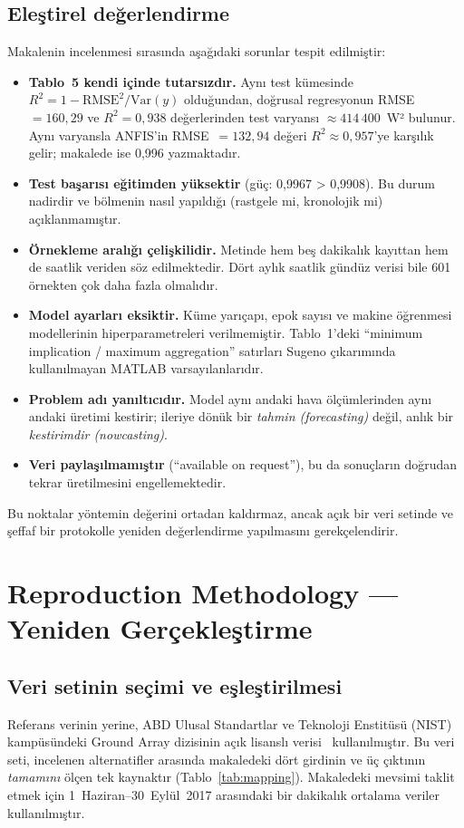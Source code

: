 \documentclass[11pt,a4paper]{article}
\begin{document}
\subsection{Eleştirel değerlendirme}
Makalenin incelenmesi sırasında aşağıdaki sorunlar tespit edilmiştir:
\begin{itemize}
\item \textbf{Tablo~5 kendi içinde tutarsızdır.} Aynı test kümesinde $R^2=1-\mathrm{RMSE}^2/\mathrm{Var}(y)$ olduğundan, doğrusal regresyonun RMSE~$=160{,}29$ ve $R^2=0{,}938$ değerlerinden test varyansı $\approx 414\,400$~W² bulunur. Aynı varyansla ANFIS'in RMSE~$=132{,}94$ değeri $R^2\approx0{,}957$'ye karşılık gelir; makalede ise 0,996 yazmaktadır.
\item \textbf{Test başarısı eğitimden yüksektir} (güç: 0,9967 > 0,9908). Bu durum nadirdir ve bölmenin nasıl yapıldığı (rastgele mi, kronolojik mi) açıklanmamıştır.
\item \textbf{Örnekleme aralığı çelişkilidir.} Metinde hem beş dakikalık kayıttan hem de saatlik veriden söz edilmektedir. Dört aylık saatlik gündüz verisi bile 601 örnekten çok daha fazla olmalıdır.
\item \textbf{Model ayarları eksiktir.} Küme yarıçapı, epok sayısı ve makine öğrenmesi modellerinin hiperparametreleri verilmemiştir. Tablo~1'deki “minimum implication / maximum aggregation” satırları Sugeno çıkarımında kullanılmayan MATLAB varsayılanlarıdır.
\item \textbf{Problem adı yanıltıcıdır.} Model aynı andaki hava ölçümlerinden aynı andaki üretimi kestirir; ileriye dönük bir \emph{tahmin (forecasting)} değil, anlık bir \emph{kestirimdir (nowcasting)}.
\item \textbf{Veri paylaşılmamıştır} (“available on request”), bu da sonuçların doğrudan tekrar üretilmesini engellemektedir.
\end{itemize}
Bu noktalar yöntemin değerini ortadan kaldırmaz, ancak açık bir veri setinde ve şeffaf bir protokolle yeniden değerlendirme yapılmasını gerekçelendirir.

\section{Reproduction Methodology — Yeniden Gerçekleştirme}

\subsection{Veri setinin seçimi ve eşleştirilmesi}
Referans verinin yerine, ABD Ulusal Standartlar ve Teknoloji Enstitüsü (NIST) kampüsündeki Ground Array dizisinin açık lisanslı verisi~\cite{nist} kullanılmıştır. Bu veri seti, incelenen alternatifler arasında makaledeki dört girdinin ve üç çıktının \emph{tamamını} ölçen tek kaynaktır (Tablo~\ref{tab:mapping}). Makaledeki mevsimi taklit etmek için 1~Haziran–30~Eylül~2017 arasındaki bir dakikalık ortalama veriler kullanılmıştır.
\end{document}
